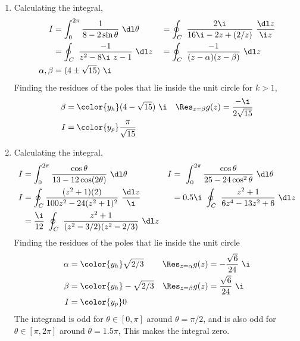 \begin{enumerate}
    \item Calculating the integral,
          \begin{align}
              I             & = \int_{0}^{2\pi} \frac{1}
              {8 - 2\sin\theta} \ \dl \theta
                            &
                            & = \oint_C\ \frac{2\i}{16\i - 2z + (2/z)}
              \ \frac{\dl z}{\i z}                                     \\
                            & = \oint_C\ \frac{-1}{z^2 - 8\i\ z - 1}
              \ \dl z       &
                            & =  \oint_C\ \frac{-1}
              {(z - \alpha)(z - \beta)} \ \dl z                        \\
              \alpha, \beta & = (4 \pm \sqrt{15})\ \i
          \end{align}
          Finding the residues of the poles that lie inside the unit circle for
          $ k > 1 $,
          \begin{align}
              \beta                 & = \color{y_h} (4 - \sqrt{15})\ \i   &
              \Res_{z = \beta} g(z) & = \frac{-\i}{2\sqrt{15}}              \\
              I                     & = \color{y_p} \frac{\pi}{\sqrt{15}}
          \end{align}

    \item Calculating the integral,
          \begin{align}
              I                  & = \int_{0}^{2\pi} \frac{\cos \theta}
              {13 - 12\cos(2\theta)} \ \dl \theta
                                 &
              I                  & = \ \int_{0}^{2\pi} \frac{\cos\theta}
              {25 - 24\cos^2\theta}\ \dl \theta                             \\
              I                  & = \oint_C \frac{(z^2 + 1)(2)}
              {100z^2 - 24(z^2 + 1)^2}
              \ \frac{\dl z}{\i} &
                                 & = 0.5\i\ \oint_C\ \frac{z^2 + 1}
              {6z^4 - 13z^2 + 6}
              \ \dl z                                                       \\
                                 & = \frac{\i}{12}\ \oint_C\ \frac{z^2 + 1}
              {(z^2 - 3/2)(z^2 - 2/3)} \ \dl z
          \end{align}
          Finding the residues of the poles that lie inside the unit circle
          \begin{align}
              \alpha                 & = \color{y_h} \sqrt{2/3}   &
              \Res_{z = \alpha} g(z) & = -\frac{\sqrt{6}}{24}\ \i   \\
              \beta                  & = \color{y_h} -\sqrt{2/3}  &
              \Res_{z = \beta} g(z)  & = \frac{\sqrt{6}}{24}\ \i    \\
              I                      & = \color{y_p} 0
          \end{align}
          The integrand is odd for $ \theta \in [0, \pi] $ around $ \theta = \pi/2 $,
          and is also odd for $ \theta \in [\pi, 2\pi] $ around $ \theta = 1.5\pi $,
          This makes the integral zero.


\end{enumerate}
